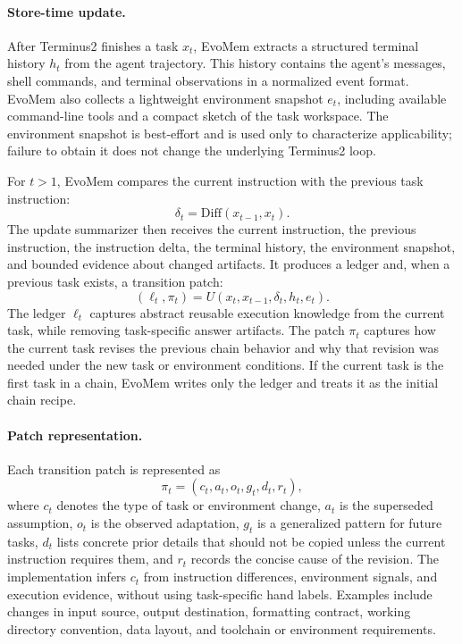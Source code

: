 \documentclass{llmxive}
\begin{document}
\paragraph{Store-time update.}
After Terminus2 finishes a task $x_t$, EvoMem extracts a structured terminal history $h_t$ from the agent trajectory. This history contains the agent's messages, shell commands, and terminal observations in a normalized event format. EvoMem also collects a lightweight environment snapshot $e_t$, including available command-line tools and a compact sketch of the task workspace. The environment snapshot is best-effort and is used only to characterize applicability; failure to obtain it does not change the underlying Terminus2 loop.

For $t>1$, EvoMem compares the current instruction with the previous task instruction:
\[
\delta_t=\mathrm{Diff}(x_{t-1},x_t).
\]
The update summarizer then receives the current instruction, the previous instruction, the instruction delta, the terminal history, the environment snapshot, and bounded evidence about changed artifacts. It produces a ledger and, when a previous task exists, a transition patch:
\[
(\ell_t,\pi_t)=U(x_t,x_{t-1},\delta_t,h_t,e_t).
\]
The ledger $\ell_t$ captures abstract reusable execution knowledge from the current task, while removing task-specific answer artifacts. The patch $\pi_t$ captures how the current task revises the previous chain behavior and why that revision was needed under the new task or environment conditions. If the current task is the first task in a chain, EvoMem writes only the ledger and treats it as the initial chain recipe.

\paragraph{Patch representation.}
Each transition patch is represented as
\[
\pi_t =
\left(
c_t,
a_t,
o_t,
g_t,
d_t,
r_t
\right),
\]
where $c_t$ denotes the type of task or environment change, $a_t$ is the superseded assumption, $o_t$ is the observed adaptation, $g_t$ is a generalized pattern for future tasks, $d_t$ lists concrete prior details that should not be copied unless the current instruction requires them, and $r_t$ records the concise cause of the revision. The implementation infers $c_t$ from instruction differences, environment signals, and execution evidence, without using task-specific hand labels. Examples include changes in input source, output destination, formatting contract, working directory convention, data layout, and toolchain or environment requirements.
\end{document}
